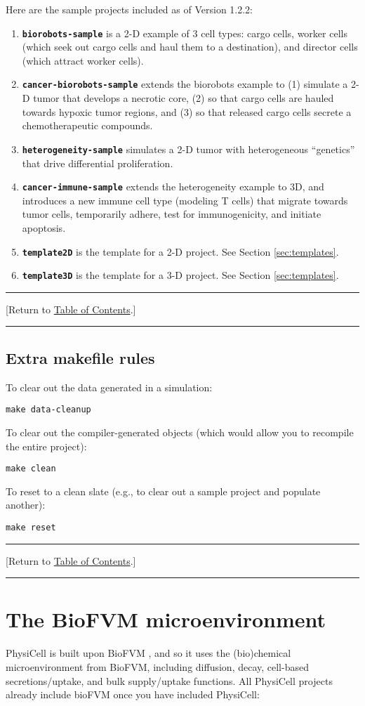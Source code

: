 \documentclass[12pt]{article}
\renewcommand{\v}{\verb}
\newcommand{\smallcode}[1]{\textbf{\texttt{#1}}}
\newcommand{\blue}[1]{\textcolor{blue}{#1}}
\newcommand{\DONE}{}%
\newcommand{\TOClink}{\begin{center}\hrule\vskip-10pt\phantom{.}\hfill[Return to \hyperlink{TOC}{Table of Contents}.]\hfill\phantom{.}\vskip3pt\hrule\end{center}}
\begin{document}
Here are the sample projects included as of Version 1.2.2: 
\begin{enumerate}
\item 
\smallcode{biorobots-sample} is a 2-D example of 3 cell types: cargo cells, worker cells (which seek out cargo cells and 
haul them to a destination), and director cells (which attract worker cells). 

\item 
\smallcode{cancer-biorobots-sample} extends the biorobots example to (1) simulate a 2-D tumor that develops a necrotic 
core, (2) so that cargo cells are hauled towards hypoxic tumor regions, and (3) so that released cargo cells secrete 
a chemotherapeutic compounds. 

\item
\smallcode{heterogeneity-sample} simulates a 2-D tumor with heterogeneous ``genetics'' that drive differential proliferation. 

\item 
\smallcode{cancer-immune-sample} extends the heterogeneity example to 3D, and introduces a new immune 
cell type (modeling T cells) that migrate towards tumor cells, temporarily adhere, test for immunogenicity, 
and initiate apoptosis. 

\item 
\smallcode{template2D} is the template for a 2-D project. See Section \ref{sec:templates}. 

\item 
\smallcode{template3D} is the template for a 3-D project. See Section \ref{sec:templates}. 
\end{enumerate}

\TOClink 

\subsection{Extra makefile rules}
\label{sec:makefiles}
To clear out the data generated in a simulation: 

\v|make data-cleanup|

To clear out the compiler-generated objects (which would allow you to recompile the entire project): 

\v|make clean| 

To reset to a clean slate (e.g., to clear out a sample project and populate another): 

\v|make reset|

\TOClink 

\section{The BioFVM microenvironment \DONE}
PhysiCell is built upon BioFVM \cite{ref:BioFVM}, and so it uses the (bio)chemical microenvironment from BioFVM, 
including diffusion, decay, cell-based secretions/uptake, and bulk supply/uptake functions. All 
PhysiCell projects already include bioFVM once you have included PhysiCell: 
\end{document}
